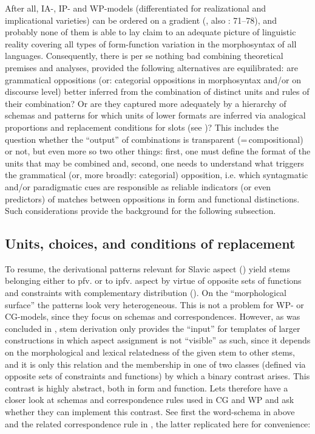 \documentclass[output=paper]{langscibook}
\begin{document}
After all, IA-, IP- and WP-models (differentiated for realizational and implicational varieties) can be ordered on a gradient (\citealt[14--17]{Blevins2016}, also \citealt{Plungjan2000}: 71--78), and probably none of them is able to lay claim to an adequate picture of linguistic reality covering all types of form-function variation in the morphosyntax of all languages. Consequently, there is per se nothing bad combining theoretical premises and analyses, provided the following alternatives are equilibrated: are grammatical oppositions (or: categorial oppositions in morphosyntax and/or on discourse level) better inferred from the combination of distinct units and rules of their combination? Or are they captured more adequately by a hierarchy of schemas and patterns for which units of lower formats are inferred via analogical proportions and replacement conditions for slots (see )? This includes the question whether the “output” of combinations is transparent (=\,compositional) or not, but even more so two other things: first, one must define the format of the units that may be combined and, second, one needs to understand what triggers the grammatical (or, more broadly: categorial) opposition, i.e. which syntagmatic and/or paradigmatic cues are responsible as reliable indicators (or even predictors) of matches between oppositions in form and functional distinctions. Such considerations provide the background for the following subsection.

\subsection{Units, choices, and conditions of replacement}\label{wiemer:4.3}

To resume, the derivational patterns relevant for Slavic aspect () yield stems belonging either to pfv. or to ipfv. aspect by virtue of opposite sets of functions and constraints with complementary distribution (). On the “morphological surface” the patterns look very heterogeneous. This is not a problem for WP- or CG-models, since they focus on schemas and correspondences. However, as was concluded in , stem derivation only provides the “input” for templates of larger constructions in which aspect assignment is not “visible” as such, since it depends on the morphological and lexical relatedness of the given stem to other stems, and it is only this relation and the membership in one of two classes (defined via opposite sets of constraints and functions) by which a binary contrast arises. This contrast is highly abstract, both in form and function. Lets therefore have a closer look at schemas and correspondence rules used in CG and WP and ask whether they can implement this contrast. See first the word-schema in  above and the related correspondence rule in , the latter replicated here for convenience:
\end{document}
